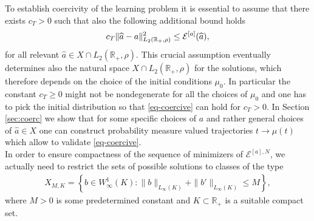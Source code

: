 To establish coercivity of the learning problem
it is essential  to assume that there exists  $c_T>0$ such that also the following additional bound holds
\begin{align}\label{eq-coercive}%
	c_T \| \widehat a - a \|^2_{L_2(\mathbb R_+,\rho)} \leq \Eahat,
\end{align}
for all relevant $\widehat a \in X \cap  L_2(\mathbb R_+,\rho)$. This crucial assumption eventually determines also the natural space $X \cap  L_2(\mathbb R_+,\rho)$ for the solutions,
which therefore depends on the choice of the initial conditions $\mu_0$. In particular the constant $c_T\geq 0$ might not be nondegenerate for all the choices of $\mu_0$
and one has to pick the initial distribution so that \eqref{eq-coercive} can hold for $c_T >0$. 
In Section \ref{sec:coerc} we show that for some specific choices of $a$ and rather general choices of $\widehat a \in X$ one can construct probability measure valued trajectories $t \to \mu(t)$ which allow to validate
\eqref{eq-coercive}.\\
In order to ensure compactness of the sequence of minimizers of $\mathcal E^{[a],N}$, we actually need to restrict the sets of possible solutions to classes of the type
\begin{align*}
X_{M,K} = \left\{b \in W^{1}_{\infty}(K) :
 \|b\|_{L_{\infty}(K)} + \|b'\|_{L_{\infty}(K)} \leq M
 \right\},
\end{align*}
where $M>0$ is some predetermined constant and $K \subset \mathbb R_+$ is a suitable compact set.


